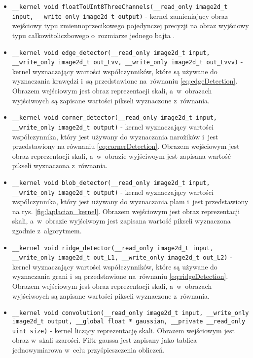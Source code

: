 \begin{itemize}
\item 
\texttt{\_\_kernel void  floatToUInt8ThreeChannels(\_\_read\_only image2d\_t input, \_\_write\_only image2d\_t output)} - kernel zamieniający obraz wejściowy typu zmiennoprzecikowego pojedynczej precyzji na obraz wyjściowy typu całkowitoliczbowego o~rozmiarze jednego bajta .

\item 
\texttt{\_\_kernel void  edge\_detector(\_\_read\_only image2d\_t input, \_\_write\_only image2d\_t out\_Lvv, \_\_write\_only image2d\_t out\_Lvvv)} - kernel wyznaczający wartości współczynników, które są używane do wyznaczania krawędzi i~są przedstawione na~równaniu \ref{eq:edgeDetection}. Obrazem wejściowym jest obraz reprezentacji skali, a~w~obrazach wyjściwoych są zapisane wartości pikseli wyznaczone z~równania.

\item 
\texttt{\_\_kernel void  corner\_detector(\_\_read\_only image2d\_t input, \_\_write\_only image2d\_t output)} - kernel wyznaczający wartości współczynnika, który jest używany do wyznaczania narożików i~jest przedstawiony na równaniu \ref{eq:cornerDetection}. Obrazem wejściowym jest obraz reprezentacji skali, a~w~obrazie wyjściwoym jest zapisana wartość pikseli wyznaczona z~równania.

\item 
\texttt{\_\_kernel void  blob\_detector(\_\_read\_only image2d\_t input, \_\_write\_only image2d\_t output)} - kernel wyznaczający wartości współczynnika, który jest używany do wyznaczania plam i~jest przedstawiony na rys. \ref{fig:laplacian_kernel}. Obrazem wejściowym jest obraz reprezentacji skali, a~w~obrazie wyjściwoym jest zapisana wartość pikseli wyznaczona zgodnie z~algorytmem.

\item 
\texttt{\_\_kernel void  ridge\_detector(\_\_read\_only image2d\_t input, \_\_write\_only image2d\_t out\_L1, \_\_write\_only image2d\_t out\_L2)} - kernel wyznaczający wartości współczynników, które są używane do wyznaczania grani i~są przedstawione na~równaniu \ref{eq:ridgeDetection}. Obrazem wejściowym jest obraz reprezentacji skali, a~w~obrazach wyjściwoych są zapisane wartości pikseli wyznaczone z~równania.

\item 
\texttt{\_\_kernel void  convolution(\_\_read\_only image2d\_t input, \_\_write\_only image2d\_t output, \_\_global float * gaussian, \_\_private \_\_read\_only uint size)} - kernel liczący reprezentację skali. Obrazem wejściowym jest obraz w~skali szarości. Filtr gaussa jest zapisany jako tablica jednowymiarowa w~celu przyśpieszczenia obliczeń.

\end{itemize}
